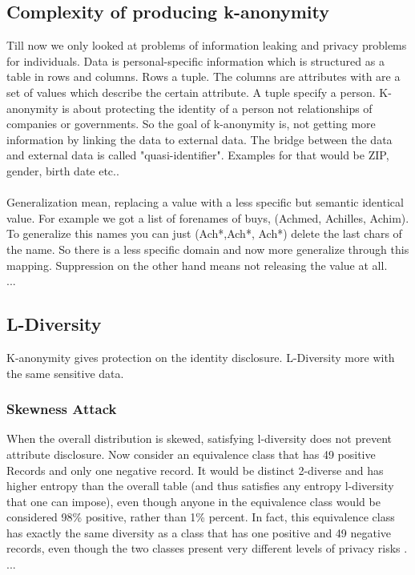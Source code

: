 \documentclass{llncs}
\begin{document}
\subsection{Complexity of producing k-anonymity}
Till now we only looked at problems of information leaking and privacy problems for individuals. Data is personal-specific information which is structured as a table in rows and columns. Rows a tuple. The columns are attributes with are a set of values which describe the certain attribute. A tuple specify a person. K-anonymity is about protecting the identity of a person not relationships of companies or governments. So the goal of k-anonymity is, not getting more information by linking the data to external data. The bridge between the data and external data is called "quasi-identifier". Examples for that would be ZIP, gender, birth date etc.. \\
\\
Generalization mean, replacing a value with a less specific but semantic identical value. For example we got a list of forenames of buys, (Achmed, Achilles, Achim). To generalize this names you can just (Ach*,Ach*, Ach*) delete the last chars of the name. So there is a less specific domain and now more generalize through this mapping. Suppression on the other hand means not releasing the value at all.
\\...
\subsection{L-Diversity}

K-anonymity gives protection on the identity disclosure. L-Diversity more with the same sensitive data. 
\subsubsection{Skewness Attack} 
When the overall distribution is skewed, satisfying l-diversity does not prevent attribute disclosure.  Now consider an equivalence class that has 49 positive Records and only one negative record. It would be distinct 2-diverse and has higher entropy than the overall table (and thus satisfies any entropy l-diversity that one can impose), even though anyone in the equivalence class would be considered 98\% positive, rather than 1\% percent. In fact, this equivalence class has exactly the same diversity as a class that has one positive and 49 negative records, even though the two classes present very different levels of privacy risks \cite{ldiversity}. 
\\...
\end{document}
